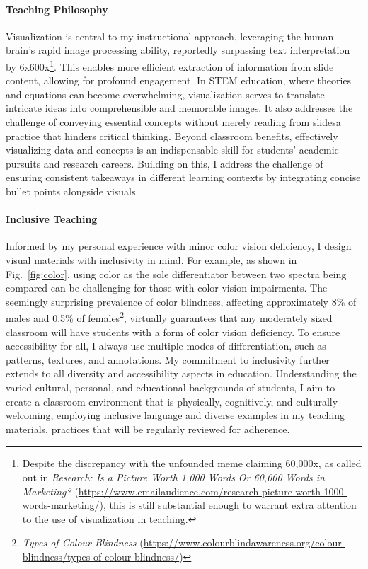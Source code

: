 \paragraph{Teaching Philosophy}
Visualization is central to my instructional approach, leveraging the human brain's rapid image processing ability, reportedly surpassing text interpretation by 6x\textendash 600x\footnote{
    Despite the discrepancy with the unfounded meme claiming 60,000x, as called out in \emph{Research: Is a Picture Worth 1,000 Words Or 60,000 Words in Marketing?} (\url{https://www.emailaudience.com/research-picture-worth-1000-words-marketing/}), this is still substantial enough to warrant extra attention to the use of visualization in teaching.
}.
This enables more efficient extraction of information from slide content, allowing for profound engagement. In STEM education, where theories and equations can become overwhelming, visualization serves to translate intricate ideas into comprehensible and memorable images. It also addresses the challenge of conveying essential concepts without merely reading from slides\textemdash a practice that hinders critical thinking. Beyond classroom benefits, effectively visualizing data and concepts is an indispensable skill for students' academic pursuits and research careers. Building on this, I address the challenge of ensuring consistent takeaways in different learning contexts by integrating concise bullet points alongside visuals.

\paragraph{Inclusive Teaching}
Informed by my personal experience with minor color vision deficiency, I design visual materials with inclusivity in mind. For example, as shown in Fig.~\ref{fig:color}, using color as the sole differentiator between two spectra being compared can be challenging for those with color vision impairments. The seemingly surprising prevalence of color blindness, affecting approximately 8\% of males and 0.5\% of females\footnote{
    \emph{Types of Colour Blindness} (\url{https://www.colourblindawareness.org/colour-blindness/types-of-colour-blindness/})
}, virtually guarantees that any moderately sized classroom will have students with a form of color vision deficiency. To ensure accessibility for all, I always use multiple modes of differentiation, such as patterns, textures, and annotations. My commitment to inclusivity further extends to all diversity and accessibility aspects in education. Understanding the varied cultural, personal, and educational backgrounds of students, I aim to create a classroom environment that is physically, cognitively, and culturally welcoming, employing inclusive language and diverse examples in my teaching materials, practices that will be regularly reviewed for adherence.


